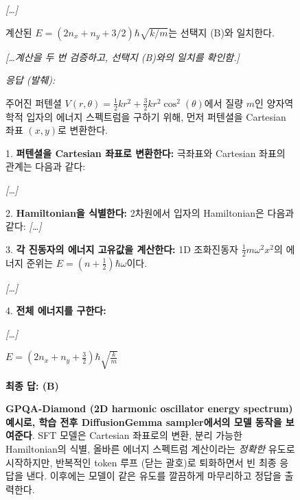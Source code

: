 \begin{figure}[t]
\begin{minipage}[t]{0.49\textwidth}
\begin{mdframed}[style=afterbox]
\begin{mdframed}[style=thinkbox]
\textit{[\ldots]}

계산된 $E = (2n_x+n_y+3/2)\hbar\sqrt{k/m}$는 선택지 (B)와 일치한다.
   
\textit{[\ldots 계산을 두 번 검증하고, 선택지 (B)와의 일치를 확인함.]}
\end{mdframed}
\smallskip
\noindent\textit{응답 (발췌):}
\begin{mdframed}[style=thinkbox]
주어진 퍼텐셜 $V(r, \theta) = \frac{1}{2}kr^2 + \frac{3}{2}kr^2\cos^2(\theta)$에서 질량 $m$인 양자역학적 입자의 에너지 스펙트럼을 구하기 위해, 먼저 퍼텐셜을 Cartesian 좌표 $(x, y)$로 변환한다.

1.  \textbf{퍼텐셜을 Cartesian 좌표로 변환한다:}
    극좌표와 Cartesian 좌표의 관계는 다음과 같다:

\textit{[\ldots]}



2.  \textbf{Hamiltonian을 식별한다:}
    2차원에서 입자의 Hamiltonian은 다음과 같다: \textit{[\ldots]}


3.  \textbf{각 진동자의 에너지 고유값을 계산한다:}
    1D 조화진동자 $\frac{1}{2}m\omega^2x^2$의 에너지 준위는 $E = (n+\frac{1}{2})\hbar\omega$이다.

\textit{[\ldots]}

4.  \textbf{전체 에너지를 구한다:}

\textit{[\ldots]}

\quad $E = (2n_x + n_y + \frac{3}{2})\hbar\sqrt{\frac{k}{m}}$

\textbf{최종 답: (B)}
\end{mdframed}
\end{mdframed}
\end{minipage}
\caption{\textbf{GPQA-Diamond (2D harmonic oscillator energy spectrum) 예시로, \sdrl 학습 전후 DiffusionGemma sampler에서의 모델 동작을 보여준다}. SFT 모델은 Cartesian 좌표로의 변환, 분리 가능한 Hamiltonian의 식별, 올바른 에너지 스펙트럼 계산이라는 \emph{정확한} 유도로 시작하지만, 반복적인 token 루프 (닫는 괄호)로 퇴화하면서 빈 최종 응답을 낸다. \sdrl 이후에는 모델이 같은 유도를 깔끔하게 마무리하고 정답을 출력한다.}
\label{fig:gpqa-rl-example-quantum}
\end{figure}
